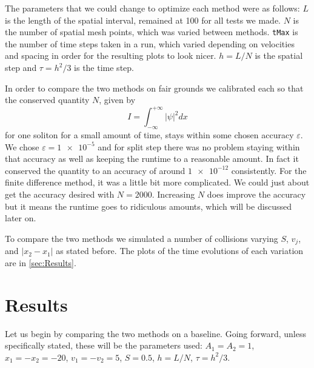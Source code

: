 \documentclass[12pt]{article}
\numberwithin{equation}{section}
\numberwithin{figure}{section}
\numberwithin{table}{section}
\begin{document}
\par The parameters that we could change to optimize each method were as follows: $L$ is the length of the spatial interval, remained at 100 for all tests we made. $N$ is the number of spatial mesh points, which was varied between methods. \texttt{tMax} is the number of time steps taken in a run, which varied depending on velocities and spacing in order for the resulting plots to look nicer. $h=L/N$ is the spatial step and $\tau=h^2/3$ is the time step. 
\par In order to compare the two methods on fair grounds we calibrated each so that the conserved quantity $N$, given by
\begin{equation}
    I=\int_{-\infty}^{+\infty}\lvert\psi\rvert^2dx
\end{equation}
for one soliton for a small amount of time, stays within some chosen accuracy $\varepsilon$. We chose $\varepsilon=\num{1e-5}$ and for split step there was no problem staying within that accuracy as well as keeping the runtime to a reasonable amount. In fact it conserved the quantity to an accuracy of around $\num{1e-12}$ consistently. For the finite difference method, it was a little bit more complicated. We could just about get the accuracy desired with $N=2000$. Increasing $N$ does improve the accuracy but it means the runtime goes to ridiculous amounts, which will be discussed later on.
\par To compare the two methods we simulated a number of collisions varying $S$, $v_j$, and $|x_2-x_1|$ as stated before. The plots of the time evolutions of each variation are in \autoref{sec:Results}.

\section{Results}\label{sec:Results}
Let us begin by comparing the two methods on a baseline. Going forward, unless specifically stated, these will be the parameters used: $A_1=A_2=1$, $x_1=-x_2=-20$, $v_1=-v_2=5$, $S=0.5$, $h=L/N$, $\tau=h^2/3$.
\end{document}
